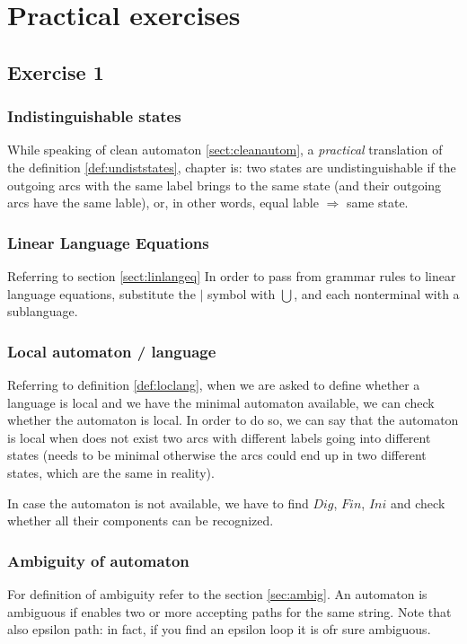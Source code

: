 \chapter{Practical exercises}
    \section{Exercise 1}
        \subsection{Indistinguishable states}
            While speaking of clean automaton \ref{sect:cleanautom}, a \emph{practical} translation of the definition \ref{def:undiststates}, chapter is: two states are 
            undistinguishable if the outgoing arcs with the same label brings to the same state (and their outgoing arcs have the same lable), or, in other words, 
            equal lable $\Rightarrow$ same state.
        \subsection{Linear Language Equations}\label{ese:linlangeq}
            Referring to section \ref{sect:linlangeq}
            In order to pass from grammar rules to linear language equations, substitute the $\vert$ symbol with $\bigcup$, and each nonterminal with a sublanguage.
        \subsection{Local automaton / language}\label{sect:practlocautom}
            Referring to definition \ref{def:loclang}, when we are asked to define whether a language is local and we have the minimal automaton available, we can check 
            whether the automaton is local. In order to do so, we can say that the automaton is local when does not exist two arcs with different labels going into 
            different states (needs to be minimal otherwise the arcs could end up in two different states, which are the same in reality).

            In case the automaton is not available, we have to find $Dig$, $Fin$, $Ini$ and check whether all their components can be recognized.
        \subsection{Ambiguity of automaton}
            For definition of ambiguity refer to the section \ref{sec:ambig}.
            An automaton is ambiguous if enables two or more accepting paths for the same string. Note that also epsilon path: in fact, if you find an epsilon loop
            it is ofr sure ambiguous.
